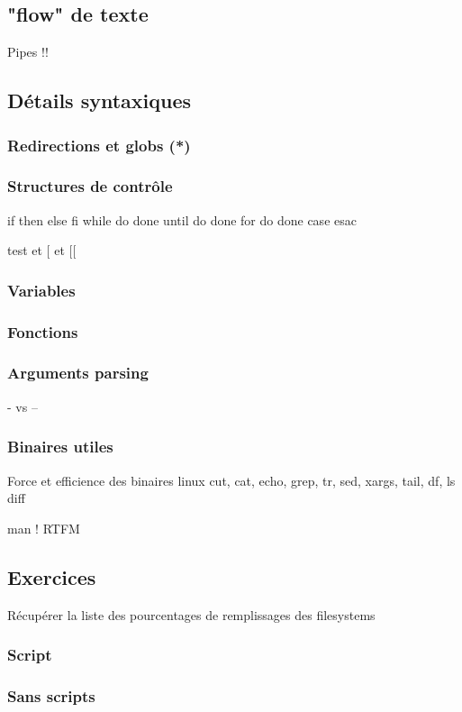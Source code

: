 \documentclass[11pt,a4paper]{article}
\begin{document}
\subsection{"flow" de texte}
Pipes !!

\subsection{Détails syntaxiques}
\subsubsection{Redirections et globs (*)}
\subsubsection{Structures de contrôle}
if then else fi
while do done
until do done
for do done
case esac

test et [ et [[

\subsubsection{Variables}


\subsubsection{Fonctions}
\subsubsection{Arguments parsing}
- vs --

\subsubsection{Binaires utiles}
Force et efficience des binaires linux
cut, cat, echo, grep, tr, sed, xargs, tail, df, ls
diff

man ! RTFM
\subsection{Exercices}
Récupérer la liste des pourcentages de remplissages des filesystems

\subsubsection{Script}

\subsubsection{Sans scripts}
\end{document}
